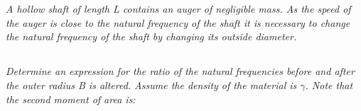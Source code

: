 \section{}
\textit{A hollow shaft of length L contains an auger of negligible mass. As the speed of the auger is close to the natural frequency of the shaft it is necessary to change the natural frequency of the shaft by changing its outside diameter.}

\subsection{}
\textit{Determine an expression for the ratio of the natural frequencies before and after the outer radius B is altered. Assume the density of the material is $\gamma$. Note that the second moment of area is:}

